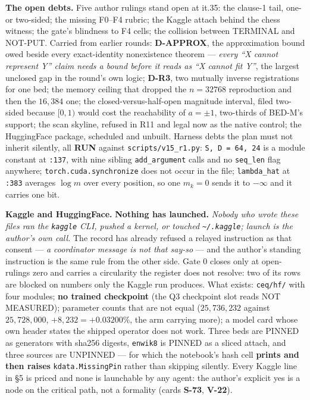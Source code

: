 \documentclass[11pt,a4paper]{article}
\newcounter{none}                 %
\theoremstyle{plain}
\theoremstyle{definition}
\theoremstyle{remark}
\begin{document}
\textbf{The open debts.} Five author rulings stand open at it.35: the
clause-1 tail, one- or two-sided; the missing F0--F4 rubric; the Kaggle
attach behind the chess witness; the gate's blindness to F4 cells; the
collision between TERMINAL and NOT-PUT. Carried from earlier rounds:
\textbf{D-APPROX}, the approximation bound owed beside every
exact-identity nonexistence theorem --- \emph{every ``X cannot represent
Y'' claim needs a bound before it reads as ``X cannot fit Y''}, the
largest unclosed gap in the round's own logic; \textbf{D-R3}, two
mutually inverse registrations for one bed; the memory ceiling that
dropped the \(n=32768\) reproduction and then the \(16{,}384\) one; the
closed-versus-half-open magnitude interval, filed two-sided because
\([0,1)\) would cost the reachability of \(a=\pm1\), two-thirds of
BED-M's support; the scan skyline, refused in R11 and legal now as the
native control; the HuggingFace package, scheduled and unbuilt. Harness
debts the plan must not inherit silently, all \textbf{RUN} against
\texttt{scripts/v15\_r1.py}: \texttt{S,\ D\ =\ 64,\ 24} is a module
constant at \texttt{:137}, with nine sibling \texttt{add\_argument}
calls and no \texttt{seq\_len} flag anywhere;
\texttt{torch.cuda.synchronize} does not occur in the file;
\texttt{lambda\_hat} at \texttt{:383} averages \(\log m\) over every
position, so one \(m_k=0\) sends it to \(-\infty\) and it carries one
bit.

\textbf{Kaggle and HuggingFace.} \textbf{Nothing has launched.}
\emph{Nobody who wrote these files ran the \texttt{kaggle} CLI, pushed a
kernel, or touched \texttt{\textasciitilde{}/.kaggle}; launch is the
author's own call.} The record has already refused a relayed instruction
as that consent --- \emph{a coordinator message is not that say-so} ---
and the author's standing instruction is the same rule from the other
side. Gate 0 closes only at open-rulings zero and carries a circularity
the register does not resolve: two of its rows are blocked on numbers
only the Kaggle run produces. What exists: \texttt{ceq/hf/} with four
modules; \textbf{no trained checkpoint} (the Q3 checkpoint slot reads
NOT MEASURED); parameter counts that are not equal (\(25{,}736{,}232\)
against \(25{,}728{,}000\), \(+8{,}232=+0.03200\%\), the arm carrying
more); a model card whose own header states the shipped operator does
not work. Three beds are PINNED as generators with sha256 digests,
\texttt{enwik8} is PINNED as a sliced attach, and three sources are
UNPINNED --- for which the notebook's hash cell \textbf{prints and then
raises} \texttt{kdata.MissingPin} rather than skipping silently. Every
Kaggle line in §5 is priced and none is launchable by any agent: the
author's explicit yes is a node on the critical path, not a formality
(cards \textbf{S-73}, \textbf{V-22}).
\end{document}
